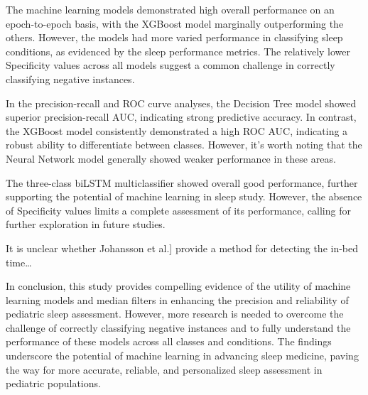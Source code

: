 \documentclass[
  super,
  preprint,
  3p]{elsarticle}
\begin{document}
The machine learning models demonstrated high overall performance on an
epoch-to-epoch basis, with the XGBoost model marginally outperforming
the others. However, the models had more varied performance in
classifying sleep conditions, as evidenced by the sleep performance
metrics. The relatively lower Specificity values across all models
suggest a common challenge in correctly classifying negative instances.

In the precision-recall and ROC curve analyses, the Decision Tree model
showed superior precision-recall AUC, indicating strong predictive
accuracy. In contrast, the XGBoost model consistently demonstrated a
high ROC AUC, indicating a robust ability to differentiate between
classes. However, it's worth noting that the Neural Network model
generally showed weaker performance in these areas.

The three-class biLSTM multiclassifier showed overall good performance,
further supporting the potential of machine learning in sleep study.
However, the absence of Specificity values limits a complete assessment
of its performance, calling for further exploration in future studies.

It is unclear whether Johansson et
al.\citep{johansson_development_2023}{]} provide a method for detecting
the in-bed time\ldots{}

In conclusion, this study provides compelling evidence of the utility of
machine learning models and median filters in enhancing the precision
and reliability of pediatric sleep assessment. However, more research is
needed to overcome the challenge of correctly classifying negative
instances and to fully understand the performance of these models across
all classes and conditions. The findings underscore the potential of
machine learning in advancing sleep medicine, paving the way for more
accurate, reliable, and personalized sleep assessment in pediatric
populations.

\newpage


\renewcommand\refname{References}
  
\end{document}
